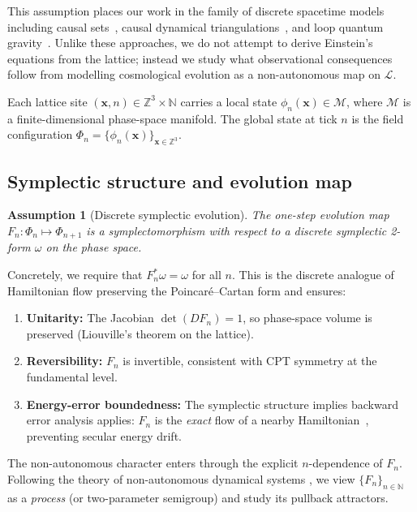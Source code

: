 \documentclass[twocolumn,showpacs,preprintnumbers,amsmath,amssymb,prd]{revtex4-2}
\newtheorem{assumption}{Assumption}
\newcommand{\ZZ}{\mathbb{Z}}
\newcommand{\NN}{\mathbb{N}}
\begin{document}
This assumption places our work in the family of discrete spacetime
models including causal sets~\cite{Bombelli1987,Surya2019},
causal dynamical triangulations~\cite{Ambjorn2012},
and loop quantum gravity~\cite{Ashtekar2004,Ashtekar2011}.
Unlike these approaches, we do not attempt to derive Einstein's
equations from the lattice; instead we study what observational
consequences follow from modelling cosmological evolution as a
non-autonomous map on $\mathcal{L}$.

Each lattice site $(\bm{x}, n) \in \ZZ^3 \times \NN$ carries a
local state $\phi_n(\bm{x}) \in \mathcal{M}$, where $\mathcal{M}$
is a finite-dimensional phase-space manifold.
The global state at tick $n$ is the field configuration
$\Phi_n = \{\phi_n(\bm{x})\}_{\bm{x}\in\ZZ^3}$.

\subsection{Symplectic structure and evolution map}
\label{sec:symplectic}

\begin{assumption}[Discrete symplectic evolution]\label{ass:symplectic}
The one-step evolution map $F_n : \Phi_n \mapsto \Phi_{n+1}$ is a
symplectomorphism with respect to a discrete symplectic 2-form
$\omega$ on the phase space.
\end{assumption}

Concretely, we require that $F_n^*\omega = \omega$ for all $n$.
This is the discrete analogue of Hamiltonian flow preserving the
Poincar\'e--Cartan form and ensures:
\begin{enumerate}
  \item \textbf{Unitarity:} The Jacobian $\det(DF_n) = 1$, so
    phase-space volume is preserved (Liouville's theorem on the lattice).
  \item \textbf{Reversibility:} $F_n$ is invertible, consistent with
    CPT symmetry at the fundamental level.
  \item \textbf{Energy-error boundedness:} The symplectic structure
    implies backward error analysis applies: $F_n$ is the
    \emph{exact} flow of a nearby Hamiltonian~\cite{HairerLubichWanner2006},
    preventing secular energy drift.
\end{enumerate}

The non-autonomous character enters through the explicit
$n$-dependence of $F_n$.
Following the theory of non-autonomous dynamical systems
\cite{Kloeden2011}, we view $\{F_n\}_{n\in\NN}$ as a
\emph{process} (or two-parameter semigroup) and study its
pullback attractors.
\end{document}
